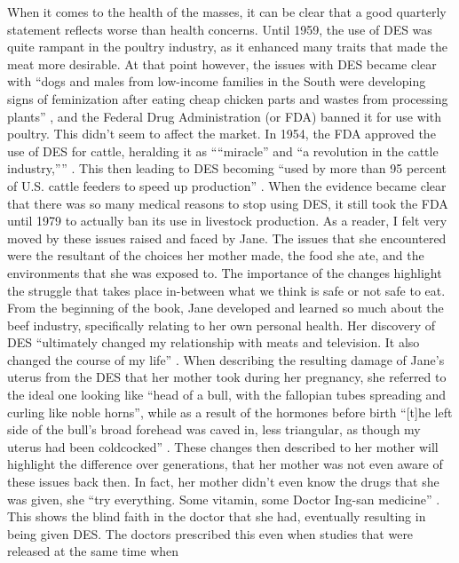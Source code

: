\documentclass{article}
\begin{document}
When it comes to the health of the masses, it can be clear that a good
quarterly statement reflects worse than health concerns. Until 1959, the use
of DES was quite rampant in the poultry industry, as it enhanced many traits
that made the meat more desirable. At that point however, the issues with
DES became clear with ``dogs and males from low-income families in the South
were developing signs of feminization after eating cheap chicken parts and
wastes from processing plants'' \cite[Ch. 6]{ozeki1998my}, and the Federal Drug
Administration (or FDA) banned it for use with poultry. This didn't seem to
affect the market. In 1954, the FDA approved the use of DES for cattle,
heralding it as ````miracle'' and ``a revolution in the cattle industry,''''
\cite[Ch. 6]{ozeki1998my}. This then leading to DES becoming ``used by more than 95
percent of U.S. cattle feeders to speed up production'' \cite[Ch. 6]{ozeki1998my}.
When the evidence became clear that there was so many medical reasons to
stop using DES, it still took the FDA until 1979 to actually ban its use in
livestock production. As a reader, I felt very moved by these issues raised
and faced by Jane. The issues that she encountered were the resultant of the
choices her mother made, the food she ate, and the environments that she was
exposed to. The importance of the changes highlight the struggle that takes
place in-between what we think is safe or not safe to eat. From the
beginning of the book, Jane developed and learned so much about the beef
industry, specifically relating to her own personal health. Her discovery of
DES ``ultimately changed my relationship with meats and television. It also
changed the course of my life'' \cite[Ch. 6]{ozeki1998my}. When describing the
resulting damage of Jane's uterus from the DES that her mother took during
her pregnancy, she referred to the ideal one looking like ``head of a bull,
with the fallopian tubes spreading and curling like noble horns'', while as
a result of the hormones before birth ``[t]he left side of the bull’s broad
forehead was caved in, less triangular, as though my uterus had been
coldcocked'' \cite[Ch. 7]{ozeki1998my}. These changes then described to her mother
will highlight the difference over generations, that her mother was not even
aware of these issues back then. In fact, her mother didn't even know the
drugs that she was given, she ``try everything. Some vitamin, some Doctor
Ing-san medicine'' \cite[Ch. 11]{ozeki1998my}. This shows the blind faith in the
doctor that she had, eventually resulting in being given DES. The doctors
prescribed this even when studies that were released at the same time when
\end{document}

